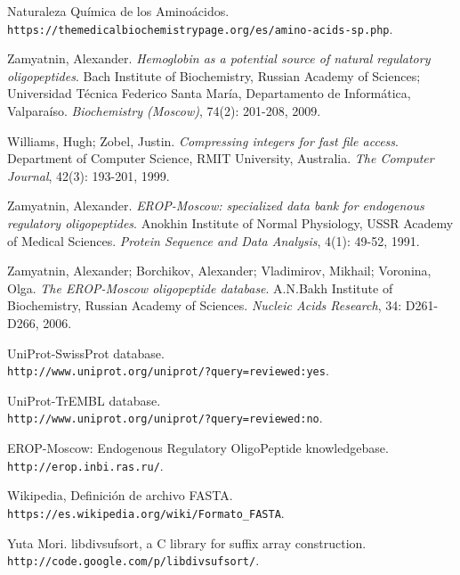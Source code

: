 \documentclass[letterpaper, 10pt, notitlepage]{report}
\newlength{\defbaselineskip}
\newcommand{\singlespacing}{\setlength{\baselineskip}{\defbaselineskip}}
\begin{document}
\begin{thebibliography}{9}
Naturaleza Química de los Aminoácidos.
\\\texttt{https://themedicalbiochemistrypage.org/es/amino-acids-sp.php}.

Zamyatnin, Alexander. 
\textit{Hemoglobin as a potential source of natural regulatory oligopeptides}. 
Bach Institute of Biochemistry, Russian Academy of Sciences; Universidad Técnica Federico Santa María, Departamento de Informática, Valparaíso. 
\textit{Biochemistry (Moscow)}, 74(2): 201-208, 2009.

Williams, Hugh; Zobel, Justin.
\textit{Compressing integers for fast file access}.
Department of Computer Science, RMIT University, Australia.
\textit{The Computer Journal}, 42(3): 193-201, 1999.

Zamyatnin, Alexander. 
\textit{EROP-Moscow: specialized data bank for endogenous regulatory oligopeptides}. 
Anokhin Institute of Normal Physiology, USSR Academy of Medical Sciences. 
\textit{Protein Sequence and Data Analysis}, 4(1): 49-52, 1991.

Zamyatnin, Alexander; Borchikov, Alexander; Vladimirov, Mikhail; Voronina, Olga. 
\textit{The EROP-Moscow oligopeptide database}. 
A.N.Bakh Institute of Biochemistry, Russian Academy of Sciences. 
\textit{Nucleic Acids Research}, 34: D261-D266, 2006.


UniProt-SwissProt database.
\\\texttt{http://www.uniprot.org/uniprot/?query=reviewed:yes}.

UniProt-TrEMBL database.
\\\texttt{http://www.uniprot.org/uniprot/?query=reviewed:no}.

EROP-Moscow: Endogenous Regulatory OligoPeptide knowledgebase.
\\\texttt{http://erop.inbi.ras.ru/}.

Wikipedia, Definición de archivo FASTA.
\\\texttt{https://es.wikipedia.org/wiki/Formato\_FASTA}.

Yuta Mori. libdivsufsort, a C library for suffix array construction.
\\\texttt{http://code.google.com/p/libdivsufsort/}.

\end{thebibliography}

%




\singlespacing
\cleardoublepage
\end{document}
